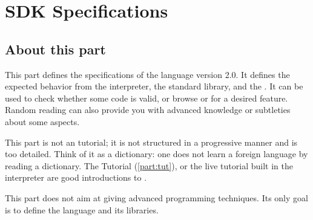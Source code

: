 \part{\urbi SDK Specifications}
\label{part:specs}

\chapter*{About this part}

This part defines the specifications of the \us language version
2.0. It defines the expected behavior from the \us interpreter, the
standard library, and the \sdk. It can be used to check whether some
code is valid, or browse \us or \Cxx \api for a desired
feature. Random reading can also provide you with advanced knowledge
or subtleties about some \us aspects.

This part is not an \us tutorial; it is not structured in a
progressive manner and is too detailed.  Think of it as a dictionary:
one does not learn a foreign language by reading a dictionary. The \us
Tutorial (\autoref{part:tut}), or the live \us tutorial built in the
interpreter are good introductions to \us.

This part does not aim at giving advanced programming techniques. Its
only goal is to define the language and its libraries.







